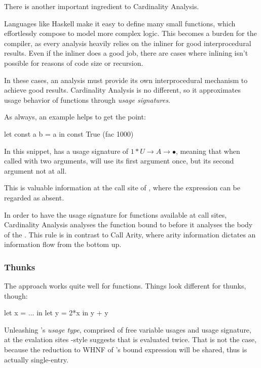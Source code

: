 There is another important ingredient to Cardinality Analysis.

Languages like Haskell make it easy to define many small functions, which effortlessly compose to model more complex logic.
This becomes a burden for the compiler, as every analysis heavily relies on the inliner for good interprocedural results.
Even if the inliner does a good job, there are cases where inlining isn't possible for reasons of code size or recursion.

In these cases, an analysis must provide its own interprocedural mechanism to achieve good results.
Cardinality Analysis is no different, so it approximates usage behavior of functions through \emph{usage signatures}.

As always, an example helps to get the point:
\begin{haskellcode}
  let const a b = a
  in const True (fac 1000) 
\end{haskellcode}

In this snippet,  has a usage signature of $1*U \to A \to \bullet$, meaning that when called with two arguments,  will use its first argument once, but its second argument not at all.

This is valuable information at the call site of , where the expression  can be regarded as absent.

In order to have the usage signature for functions available at call sites, Cardinality Analysis analyses the function bound to  before it analyses the body of the .
This  rule \parencite{card} is in contrast to Call Arity, where arity information dictates an information flow from the bottom up.

\subsubsection{Thunks}

The  approach works quite well for functions.
Things look different for thunks, though:
\begin{haskellcode}
  let x = ...
  in let y = 2*x
     in y + y
\end{haskellcode}

Unleashing 's \emph{usage type}, comprised of free variable usages and usage signature, at the evalation sites -style suggests that  is evaluated twice.
That is not the case, because the reduction to WHNF of 's bound expression will be shared, thus  is actually single-entry.

